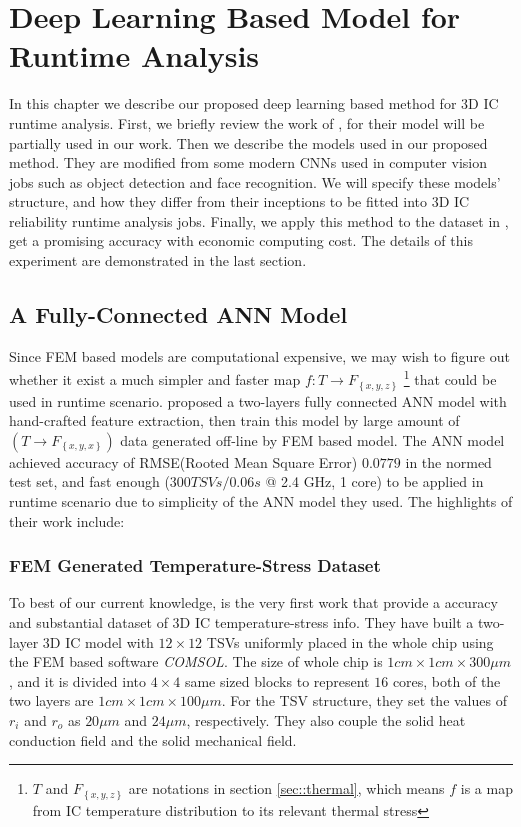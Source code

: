 
\chapter{Deep Learning Based Model for Runtime Analysis}
In this chapter we describe our proposed deep learning based method for 3D IC runtime analysis.
First, we briefly review the work of \cite{Zhang2016Fast}, for their model
will be partially used in our work.
Then we describe the models used in our proposed method. They are modified from some modern
CNNs used in computer vision jobs such as object detection and face recognition.
We will specify these models' structure, and how they differ from their inceptions
to be fitted into 3D IC reliability runtime analysis jobs.
Finally, we apply this method to the dataset in \cite{Zhang2016Fast},
get a promising accuracy with economic computing cost.
The details of this experiment are demonstrated in the last section.

\section{A Fully-Connected ANN Model}
Since FEM based models are computational expensive, we may wish to figure out whether
it exist a much simpler and faster map $f: T \to F_{\left\{ x,y,z \right\}}$
\footnote{$T$ and $F_{\left\{ x,y,z \right\}}$ are notations in section \ref{sec::thermal}, which means
$f$ is a map from IC temperature distribution to its relevant thermal stress}
that could be used in runtime scenario.
\cite{Zhang2016Fast} proposed a two-layers fully connected ANN model with hand-crafted
feature extraction, then train this model by large amount of $(T \to F_{\left\{x,y,x\right\}})$ data
generated off-line by FEM based model. 
The ANN model achieved accuracy of RMSE(Rooted Mean Square Error) $0.0779$
in the normed test set, and fast enough 
($300 TSVs / 0.06s$ @ 2.4 GHz, 1 core) to be applied
in runtime scenario due to simplicity of the ANN model they used.
The highlights of their work include:

\subsection{FEM Generated Temperature-Stress Dataset} \label{sec::FEM-data}
To best of our current knowledge, \cite{Zhang2016Fast} is the very first work that provide a
accuracy and substantial dataset of 3D IC temperature-stress info.
They have built a two-layer 3D IC model with $12\times12$ TSVs uniformly placed
in the whole chip using the FEM based software \textit{COMSOL}.
The size of whole chip is $1cm\times1cm\times300\mu m$, and it is
divided into $4\times4$ same sized blocks to represent $16$ cores,
both of the two layers are $1cm\times1cm\times100\mu m$. 
For the TSV structure, they set the values of $r_i$ and $r_o$
as $20\mu m$ and $24\mu m$, respectively. They also couple
the solid heat conduction field and the solid mechanical field.

